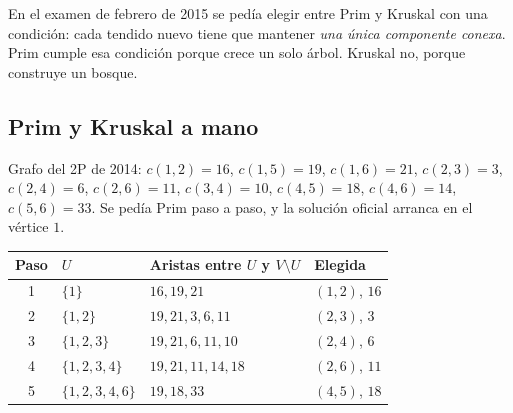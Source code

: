 En el examen de febrero de 2015 se pedía elegir entre Prim y Kruskal con una condición: cada tendido nuevo tiene que mantener \emph{una única componente conexa}. Prim cumple esa condición porque crece un solo árbol. Kruskal no, porque construye un bosque.

\subsection{Prim y Kruskal a mano}

Grafo del 2P de 2014: $c(1,2)=16$, $c(1,5)=19$, $c(1,6)=21$, $c(2,3)=3$, $c(2,4)=6$, $c(2,6)=11$, $c(3,4)=10$, $c(4,5)=18$, $c(4,6)=14$, $c(5,6)=33$. Se pedía Prim paso a paso, y la solución oficial arranca en el vértice $1$.

\begin{center}
\end{center}

\begin{center}
\small
\begin{tabularx}{\textwidth}{@{}c>{\raggedright\arraybackslash}p{2.4cm}>{\raggedright\arraybackslash}X>{\raggedright\arraybackslash}p{1.9cm}@{}}
\toprule
Paso & $U$ & Aristas entre $U$ y $V\setminus U$ & Elegida \\
\midrule
1 & $\{1\}$ & $16,19,21$ & $(1,2)$, $16$ \\
2 & $\{1,2\}$ & $19,21,3,6,11$ & $(2,3)$, $3$ \\
3 & $\{1,2,3\}$ & $19,21,6,11,10$ & $(2,4)$, $6$ \\
4 & $\{1,2,3,4\}$ & $19,21,11,14,18$ & $(2,6)$, $11$ \\
5 & $\{1,2,3,4,6\}$ & $19,18,33$ & $(4,5)$, $18$ \\
\bottomrule
\end{tabularx}
\end{center}

